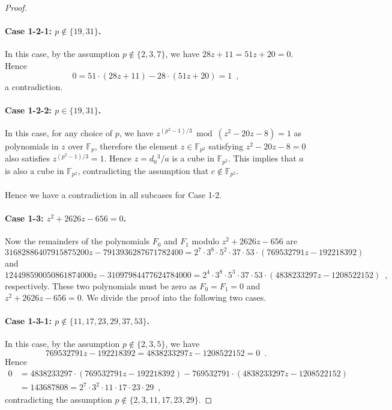 \documentclass[10pt,a4paper]{amsart}
\newcommand{\FF}{\mathbb{F}}
\begin{document}
\begin{proof}
\paragraph{Case 1-2-1: $p \not\in \{19,31\}$.}

In this case, by the assumption $p \not\in \{2,3,7\}$, we have $28z + 11 = 51z + 20 = 0$.
Hence
\[
0 = 51 \cdot (28 z + 11) - 28 \cdot (51 z + 20)
= 1 \enspace,
\]
a contradiction.

\paragraph{Case 1-2-2: $p \in \{19,31\}$.}

In this case, for any choice of $p$, we have $z^{(p^2 - 1) / 3} \bmod (z^2 - 20z - 8) = 1$ as polynomials in $z$ over $\FF_p$, therefore the element $z \in \FF_{p^2}$ satisfying $z^2 - 20z - 8 = 0$ also satisfies $z^{(p^2 - 1) / 3} = 1$.
Hence $z = d_0{}^3 / a$ is a cube in $\FF_{p^2}$.
This implies that $a$ is also a cube in $\FF_{p^2}$, contradicting the assumption that $c \not\in \FF_{p^2}$.

\paragraph{}

Hence we have a contradiction in all subcases for Case 1-2.

\paragraph{Case 1-3: $z^2 + 2626 z - 656 = 0$.}

Now the remainders of the polynomials $F_0$ and $F_1$ modulo $z^2 + 2626 z - 656$ are
\[
31682886407915875200 z - 7913936287671782400
= 2^7 \cdot 3^8 \cdot 5^2 \cdot 37 \cdot 53 \cdot (769532791 z - 192218392)
\]
and
\[
124498590050861874000 z - 31097984477624784000
= 2^4 \cdot 3^8 \cdot 5^3 \cdot 37 \cdot 53 \cdot (4838233297 z - 1208522152) \enspace,
\]
respectively.
These two polynomials must be zero as $F_0 = F_1 = 0$ and $z^2 + 2626 z - 656 = 0$.
We divide the proof into the following two cases.

\paragraph{Case 1-3-1: $p \not\in \{11,17,23,29,37,53\}$.}

In this case, by the assumption $p \not\in \{2,3,5\}$, we have
\[
769532791 z - 192218392
= 4838233297 z - 1208522152
= 0 \enspace.
\]
Hence
\[
\begin{split}
0 &= 4838233297 \cdot (769532791 z - 192218392) - 769532791 \cdot (4838233297 z - 1208522152) \\
&= 143687808
= 2^7 \cdot 3^2 \cdot 11 \cdot 17 \cdot 23 \cdot 29 \enspace,
\end{split}
\]
contradicting the assumption $p \not\in \{2,3,11,17,23,29\}$.


\end{proof}
\end{document}
